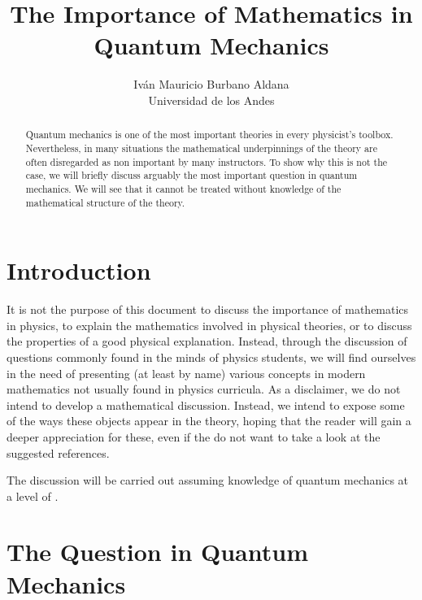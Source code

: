\documentclass{article}
\title{The Importance of Mathematics in Quantum Mechanics}
\author{Iván Mauricio Burbano Aldana \\ Universidad de los Andes}
\begin{document}
\maketitle

\begin{abstract}

Quantum mechanics is one of the most important theories in every physicist's toolbox. Nevertheless, in many situations the mathematical underpinnings of the theory are often disregarded as non important by many instructors. To show why this is not the case, we will briefly discuss arguably the most important question in quantum mechanics. We will see that it cannot be treated without knowledge of the mathematical structure of the theory.

\end{abstract}

\section{Introduction}

It is not the purpose of this document to discuss the importance of mathematics in physics, to explain the mathematics involved in physical theories, or to discuss the properties of a good physical explanation. Instead, through the discussion of questions commonly found in the minds of physics students, we will find ourselves in the need of presenting (at least by name) various concepts in modern mathematics not usually found in physics curricula. As a disclaimer, we do not intend to develop a mathematical discussion. Instead, we intend to expose some of the ways these objects appear in the theory, hoping that the reader will gain a deeper appreciation for these, even if the do not want to take a look at the suggested references.   

The discussion will be carried out assuming knowledge of quantum mechanics at a level of \cite{Zettili2009}. 

\section{The Question in Quantum Mechanics}
\end{document}
